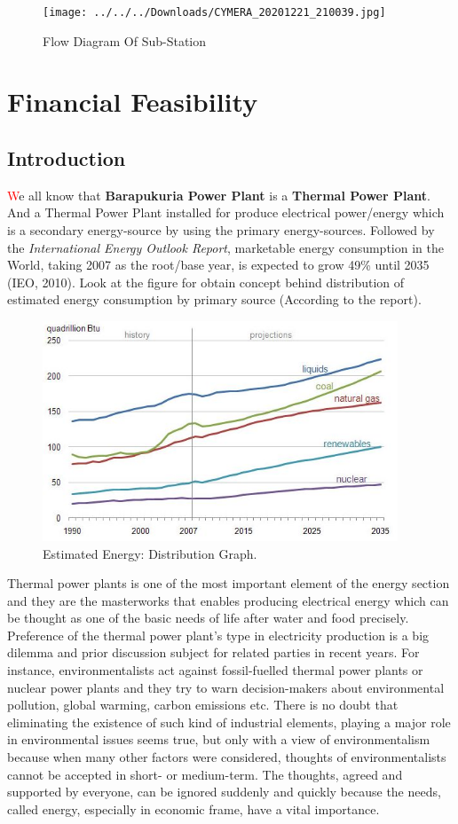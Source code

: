\documentclass[11 pt]{article}
\begin{document}
\begin{figure}[h!]
\centering
\texttt{[image: ../../../Downloads/CYMERA\_20201221\_210039.jpg]}
\caption{Flow Diagram Of Sub-Station}
\end{figure}

\section{Financial Feasibility}
\subsection{Introduction}
{\huge\textcolor{red}{\hspace{5 mm}W}}e all know that \textbf{Barapukuria Power Plant} is a \textbf{Thermal Power Plant}. And a Thermal Power Plant installed for produce electrical power/energy which is a secondary energy-source by using the primary energy-sources. Followed by the \textit{International Energy Outlook Report}, marketable energy consumption in the World, taking 2007 as the root/base year, is expected to grow 49\% until 2035 (IEO, 2010). Look at the figure for obtain concept behind distribution of estimated energy consumption by primary source (According to the report).\\
\begin{figure}[h]
\caption{Estimated Energy: Distribution Graph.}
\centering
\includegraphics[width=300pt]{Gallery/report figure.jpg}
\end{figure}

Thermal power plants is one of the most important element of the energy section and they are the masterworks that enables producing electrical energy which can be thought as one of the basic needs of life after water and food precisely. Preference of the thermal power plant's type in electricity production is a big dilemma and prior discussion subject for related parties in recent years. For instance, environmentalists act against fossil-fuelled thermal power plants or nuclear power plants and they try to warn decision-makers about environmental pollution, global warming, carbon emissions etc. There is no doubt that eliminating the existence of such kind of industrial elements, playing a major role in environmental issues seems true, but only with a view of environmentalism because when many other factors were considered, thoughts of environmentalists cannot be accepted in short- or medium-term. The thoughts, agreed and supported by everyone, can be ignored suddenly and quickly because the needs, called energy, especially in economic frame, have a vital importance.
\end{document}
